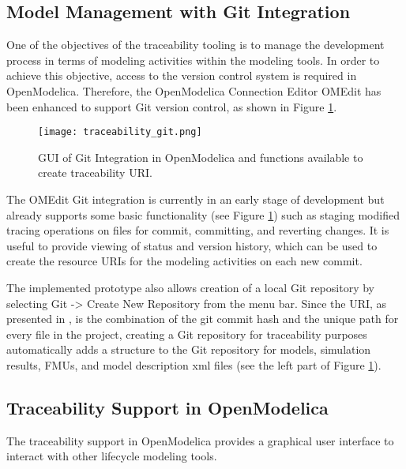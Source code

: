\subsection{Model Management with Git Integration}
\label{sec:tracaebilitygit}

One of the objectives of the traceability tooling is to manage the development process in terms of modeling
activities within the modeling tools. In order to achieve this objective, access to the version control system is
required in OpenModelica. Therefore, the OpenModelica Connection Editor OMEdit has been enhanced to support Git version 
control, as shown in Figure \ref{fig:traceabilitygit}.

\begin{figure} [!h]
	\texttt{[image: traceability\_git.png]}
	\caption{GUI of Git Integration in OpenModelica and functions available to create traceability URI.}
	\label{fig:traceabilitygit}
\end{figure}

The OMEdit Git integration is currently in an early stage of development but already supports some basic
functionality (see Figure \ref{fig:traceabilitygit}) such as staging modified tracing operations on files 
for commit, committing, and reverting changes. It is useful to provide viewing of status and version history, 
which can be used to create the resource URIs for the modeling activities on each new commit.

The implemented prototype also allows creation of a local Git repository by selecting Git -> Create New Repository from the menu bar. 
Since the URI, as presented in \cite{intocpsjohn}, is the combination of the git commit hash and the unique path for every file in the
project, creating a Git repository for traceability purposes automatically adds a structure to the Git repository for models, simulation results, FMUs, and model description \acrshort{xml} files (see the left
part of Figure \ref{fig:traceabilitygit}).

\subsection{Traceability Support in OpenModelica}
\label{subsec:traceabilityopenmodelica}

The traceability support in OpenModelica provides a graphical user interface to interact with other lifecycle
modeling tools.

